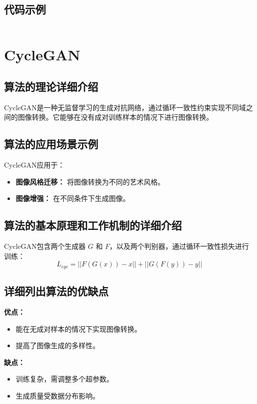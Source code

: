 \subsection*{代码示例}
\begin{lstlisting}

\end{lstlisting}


\section{CycleGAN}
\subsection*{算法的理论详细介绍}
CycleGAN是一种无监督学习的生成对抗网络，通过循环一致性约束实现不同域之间的图像转换。它能够在没有成对训练样本的情况下进行图像转换。

\subsection*{算法的应用场景示例}
CycleGAN应用于：
\begin{itemize}
    \item \textbf{图像风格迁移：} 将图像转换为不同的艺术风格。
    \item \textbf{图像增强：} 在不同条件下生成图像。
\end{itemize}

\subsection*{算法的基本原理和工作机制的详细介绍}
CycleGAN包含两个生成器 \(G\) 和 \(F\)，以及两个判别器，通过循环一致性损失进行训练：
\[
    L_{cyc} = || F(G(x)) - x || + || G(F(y)) - y ||
\]

\subsection*{详细列出算法的优缺点}
\textbf{优点：}
\begin{itemize}
    \item 能在无成对样本的情况下实现图像转换。
    \item 提高了图像生成的多样性。
\end{itemize}

\textbf{缺点：}
\begin{itemize}
    \item 训练复杂，需调整多个超参数。
    \item 生成质量受数据分布影响。
\end{itemize}

